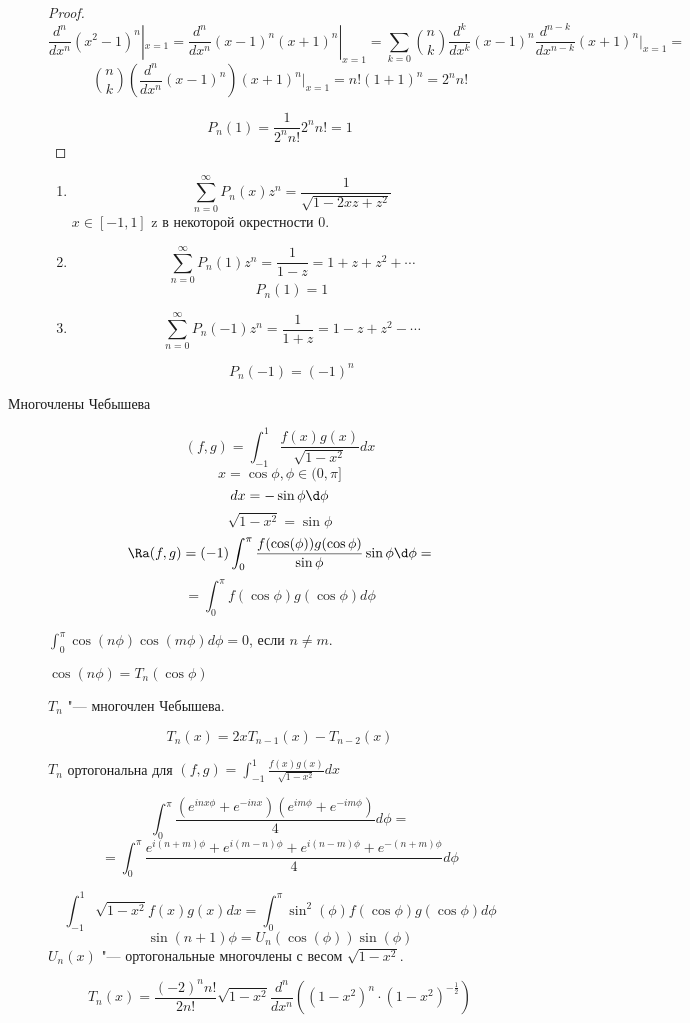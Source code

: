 \begin{description}
\begin{proof}
    $$\frac{d^n}{dx^n}(x^2 - 1)^n|_{x = 1} = \frac{d^n}{dx^n}(x - 1)^n(x + 1)^n|_{x = 1} = \sum_{k = 0}\binom{n}{k}\frac{d^k}{dx^k}(x - 1)^n\frac{d^{n - k}}{dx^{n - k}}(x + 1)^n|_{x = 1} = $$
    $$ \binom{n}{k}(\frac{d^n}{dx^n}(x - 1)^n)(x + 1)^n|_{x = 1} = n!(1 + 1)^n = 2^nn!$$

    $$P_n(1) = \frac{1}{2^nn!}2^nn! = 1$$
    \end{proof}

    \begin{theorem}
    \begin{enumerate}
    \item
    $$\sum_{n = 0}^{\infty}P_n(x)z^n = \frac{1}{\sqrt{1 - 2xz + z^2}}$$
    $x \in [-1,1]$ z в некоторой окрестности 0.
    \item
    $$\sum_{n = 0}^{\infty}P_n(1)z^n = \frac{1}{1 - z} = 1 + z + z^2 + \cdots $$
    $$P_n(1) = 1$$
    \item
    $$\sum_{n = 0}^{\infty}P_n(-1)z^n = \frac{1}{1 + z} = 1 - z + z^2 - \cdots$$

    $$P_n(-1) = (-1)^n $$
    \end{enumerate}
    \end{theorem}
\item[Многочлены Чебышева]
$$(f, g) = \int_{-1}^{1} \frac{f(x)g(x)}{\sqrt{1 - x^2}}dx$$
$$x = \cos \phi, \phi \in (0, \pi]$$
$$dx = -\sin \phi \d\phi $$
$$\sqrt{1 - x^2} = \sin \phi$$
$$\Ra (f, g) = (-1)\int_{0}^{\pi}\frac{f(\cos(\phi))g(\cos \phi)}{\sin \phi}\sin \phi \d \phi = $$
$$= \int_{0}^{\pi}f(\cos \phi)g(\cos \phi) d \phi$$

$\int_{0}^{\pi}\cos(n\phi)\cos(m\phi) d \phi = 0$, если $n \ne m$.

$\cos(n \phi) = T_n(\cos \phi)$

$T_n$ "--- многочлен Чебышева. 

$$T_n(x) = 2xT_{n - 1}(x) - T_{n - 2}(x)$$

$T_n$ ортогональна для $(f, g) = \int_{-1}^{1}\frac{f(x)g(x)}{\sqrt{1 - x^2}}dx$

$$\int_{0}^{\pi}\frac{(e^{inx\phi} + e^{-inx})(e^{im\phi} + e^{-im\phi})}{4} d\phi =  $$
$$= \int_{0}^{\pi}\frac{e^{i(n + m)\phi} + e^{i(m - n) \phi} + e^{i(n - m) \phi} + e^{-(n + m)\phi}}{4}d\phi $$

$$\int_{-1}^{1}\sqrt{1 - x^2}f(x)g(x)dx = \int_{0}^{\pi}\sin^2(\phi)f(\cos \phi)g(\cos \phi) d \phi$$
$$\sin(n + 1)\phi= U_n(\cos(\phi))\sin(\phi)$$
$U_n(x)$ "--- ортогональные многочлены с весом $\sqrt{1 - x^2}$.

$$T_n(x) = \frac{(-2)^nn!}{2n!}\sqrt{1 - x^2}\frac{d^n}{dx^n}((1 - x^2)^n \cdot (1 - x^2)^{-\frac{1}{2}}) $$


\end{description}
